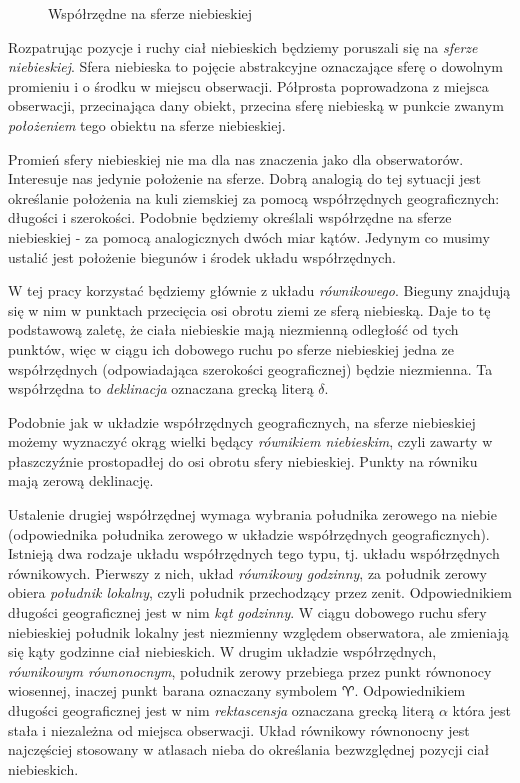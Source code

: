 \begin{figure}
\label{fig_sfera}

\caption{Współrzędne na sferze niebieskiej}
\end{figure}

Rozpatrując pozycje i ruchy ciał niebieskich będziemy poruszali się na
\emph{sferze niebieskiej}. Sfera niebieska to pojęcie abstrakcyjne oznaczające
sferę o dowolnym promieniu i o środku w miejscu obserwacji.  Półprosta
poprowadzona z miejsca obserwacji, przecinająca dany obiekt, przecina sferę
niebieską w punkcie zwanym \emph{położeniem} tego obiektu na sferze niebieskiej.

Promień sfery niebieskiej nie ma dla nas znaczenia jako dla obserwatorów.
Interesuje nas jedynie położenie na sferze. Dobrą analogią do tej sytuacji jest
określanie położenia na kuli ziemskiej za pomocą współrzędnych geograficznych:
długości i szerokości. Podobnie będziemy określali współrzędne na sferze
niebieskiej - za pomocą analogicznych dwóch miar kątów. Jedynym co musimy
ustalić jest położenie biegunów i środek układu współrzędnych.

W tej pracy korzystać będziemy głównie z układu \emph{równikowego}. Bieguny
znajdują się w nim w punktach przecięcia osi obrotu ziemi ze sferą niebieską.
Daje to tę podstawową zaletę, że ciała niebieskie mają niezmienną odległość od
tych punktów, więc w ciągu ich dobowego ruchu po sferze niebieskiej jedna ze
współrzędnych (odpowiadająca szerokości geograficznej) będzie niezmienna. Ta
współrzędna to \emph{deklinacja} oznaczana grecką literą $\delta$.

Podobnie jak w układzie współrzędnych geograficznych, na sferze niebieskiej
możemy wyznaczyć okrąg wielki będący \emph{równikiem niebieskim}, czyli zawarty
w płaszczyźnie prostopadłej do osi obrotu sfery niebieskiej. Punkty na równiku
mają zerową deklinację.

Ustalenie drugiej współrzędnej wymaga wybrania południka zerowego na niebie
(odpowiednika południka zerowego w układzie współrzędnych geograficznych).
Istnieją dwa rodzaje układu współrzędnych tego typu, tj. układu współrzędnych
równikowych.  Pierwszy z nich, układ \emph{równikowy godzinny}, za południk
zerowy obiera \emph{południk lokalny}, czyli południk przechodzący przez zenit.
Odpowiednikiem długości geograficznej jest w nim \emph{kąt godzinny}. W ciągu
dobowego ruchu sfery niebieskiej południk lokalny jest niezmienny względem
obserwatora, ale zmieniają się kąty godzinne ciał niebieskich. W drugim układzie
współrzędnych, \emph{równikowym równonocnym}, południk zerowy przebiega przez
punkt równonocy wiosennej, inaczej punkt barana oznaczany symbolem $\aries$.
Odpowiednikiem długości geograficznej jest w nim \emph{rektascensja} oznaczana
grecką literą $\alpha$ która jest stała i niezależna od miejsca obserwacji.
Układ równikowy równonocny jest najczęściej stosowany w atlasach nieba do
określania bezwzględnej pozycji ciał niebieskich.

